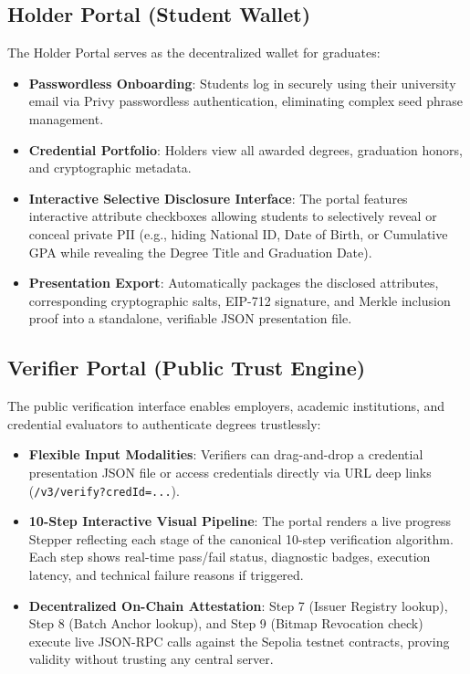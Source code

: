 \subsection{Holder Portal (Student Wallet)}
The Holder Portal serves as the decentralized wallet for graduates:
\begin{itemize}
    \item \textbf{Passwordless Onboarding}: Students log in securely using their university email via Privy passwordless authentication, eliminating complex seed phrase management.
    \item \textbf{Credential Portfolio}: Holders view all awarded degrees, graduation honors, and cryptographic metadata.
    \item \textbf{Interactive Selective Disclosure Interface}: The portal features interactive attribute checkboxes allowing students to selectively reveal or conceal private PII (e.g., hiding National ID, Date of Birth, or Cumulative GPA while revealing the Degree Title and Graduation Date).
    \item \textbf{Presentation Export}: Automatically packages the disclosed attributes, corresponding cryptographic salts, EIP-712 signature, and Merkle inclusion proof into a standalone, verifiable JSON presentation file.
\end{itemize}

\subsection{Verifier Portal (Public Trust Engine)}
The public verification interface enables employers, academic institutions, and credential evaluators to authenticate degrees trustlessly:
\begin{itemize}
    \item \textbf{Flexible Input Modalities}: Verifiers can drag-and-drop a credential presentation JSON file or access credentials directly via URL deep links (\texttt{/v3/verify?credId=...}).
    \item \textbf{10-Step Interactive Visual Pipeline}: The portal renders a live progress Stepper reflecting each stage of the canonical 10-step verification algorithm. Each step shows real-time pass/fail status, diagnostic badges, execution latency, and technical failure reasons if triggered.
    \item \textbf{Decentralized On-Chain Attestation}: Step 7 (Issuer Registry lookup), Step 8 (Batch Anchor lookup), and Step 9 (Bitmap Revocation check) execute live JSON-RPC calls against the Sepolia testnet contracts, proving validity without trusting any central server.
\end{itemize}

